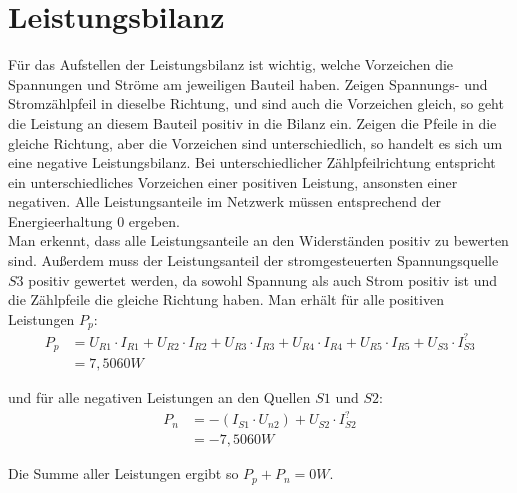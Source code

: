 \documentclass[11pt]{scrartcl}
\begin{document}
\section{Leistungsbilanz}
Für das Aufstellen der Leistungsbilanz ist wichtig, welche Vorzeichen die Spannungen und Ströme am jeweiligen Bauteil haben.
Zeigen Spannungs- und Stromzählpfeil in dieselbe Richtung, und sind auch die Vorzeichen gleich, so geht die Leistung an
diesem Bauteil positiv in die Bilanz ein.
Zeigen die Pfeile in die gleiche Richtung, aber die Vorzeichen sind unterschiedlich, so handelt es sich um eine negative Leistungsbilanz.
Bei unterschiedlicher Zählpfeilrichtung entspricht ein unterschiedliches Vorzeichen einer positiven Leistung, ansonsten einer negativen.
Alle Leistungsanteile im Netzwerk müssen entsprechend der Energieerhaltung 0 ergeben. \\
Man erkennt, dass alle Leistungsanteile an den Widerständen positiv zu bewerten sind.
Außerdem muss der Leistungsanteil der stromgesteuerten Spannungsquelle $S3$ positiv gewertet werden, da sowohl
Spannung als auch Strom positiv ist und die Zählpfeile die gleiche Richtung haben.
Man erhält für alle positiven Leistungen $P_p$:
\begin{align*}
  P_p &= U_{R1} \cdot I_{R1} +
        U_{R2} \cdot I_{R2} +
        U_{R3} \cdot I_{R3} +
        U_{R4} \cdot I_{R4} +
        U_{R5} \cdot I_{R5} +
        U_{S3} \cdot I_{S3}^? \\
      &= 7,5060 \unit{W}
      \end{align*}

und für alle negativen Leistungen an den Quellen $S1$ und $S2$:
\begin{align*}
  P_n &= -(I_{S1} \cdot U_{n2}) + U_{S2} \cdot I_{S2}^? \\
      &= -7,5060 \unit{W}
\end{align*}

Die Summe aller Leistungen ergibt so $P_p + P_n = 0 \unit{W}$.
\end{document}
